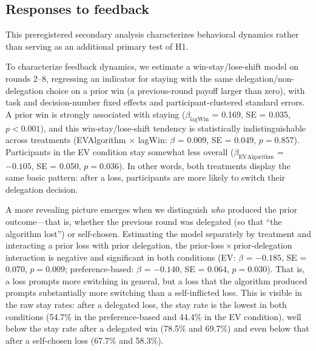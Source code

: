 \documentclass[a4paper, 12pt, fleqn]{article}
\theoremstyle{definition}
\begin{document}


\subsection{Responses to feedback}
This preregistered secondary analysis characterizes behavioral dynamics rather than serving as an additional primary test of H1.

To characterize feedback dynamics, we estimate a win-stay/lose-shift model on rounds 2--8, regressing an indicator for staying with the same delegation/non-delegation choice on a prior win (a previous-round payoff larger than zero), with task and decision-number fixed effects and participant-clustered standard errors. A prior win is strongly associated with staying ($\beta_{\text{lagWin}}$ = 0.169, SE = 0.035, $p < 0.001$), and this win-stay/lose-shift tendency is statistically indistinguishable across treatments (EVAlgorithm $\times$ lagWin: $\beta$ = 0.009, SE = 0.049, $p = 0.857$). Participants in the EV condition stay somewhat less overall ($\beta_{\text{EVAlgorithm}}$ = $-0.105$, SE = 0.050, $p = 0.036$). In other words, both treatments display the same basic pattern: after a loss, participants are more likely to switch their delegation decision.

A more revealing picture emerges when we distinguish \emph{who} produced the prior outcome---that is, whether the previous round was delegated (so that ``the algorithm lost'') or self-chosen. Estimating the model separately by treatment and interacting a prior loss with prior delegation, the prior-loss\,$\times$\,prior-delegation interaction is negative and significant in both conditions (EV: $\beta$ = $-0.185$, SE = 0.070, $p = 0.009$; preference-based: $\beta$ = $-0.140$, SE = 0.064, $p = 0.030$). That is, a loss prompts more switching in general, but a loss that the algorithm produced prompts substantially more switching than a self-inflicted loss. This is visible in the raw stay rates: after a delegated loss, the stay rate is the lowest in both conditions (54.7\% in the preference-based and 44.4\% in the EV condition), well below the stay rate after a delegated win (78.5\% and 69.7\%) and even below that after a self-chosen loss (67.7\% and 58.3\%). 
\end{document}
